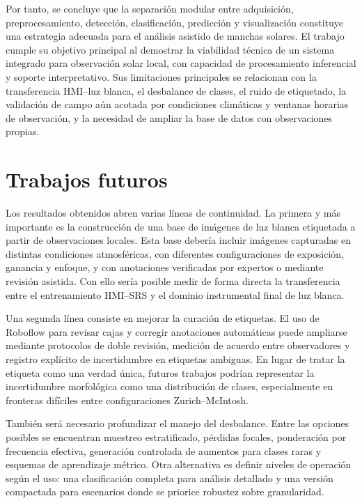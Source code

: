 Por tanto, se concluye que la separación modular entre adquisición,
preprocesamiento, detección, clasificación, predicción y visualización constituye
una estrategia adecuada para el análisis asistido de manchas solares. El trabajo
cumple su objetivo principal al demostrar la viabilidad técnica de un sistema
integrado para observación solar local, con capacidad de procesamiento
inferencial y soporte interpretativo. Sus limitaciones principales se relacionan
con la transferencia HMI--luz blanca, el desbalance de clases, el ruido de
etiquetado, la validación de campo aún acotada por condiciones climáticas y
ventanas horarias de observación, y la necesidad de ampliar la base de datos con
observaciones propias.

\section{Trabajos futuros}

Los resultados obtenidos abren varias líneas de continuidad. La primera y más
importante es la construcción de una base de imágenes de luz blanca etiquetada a
partir de observaciones locales. Esta base debería incluir imágenes capturadas en
distintas condiciones atmosféricas, con diferentes configuraciones de exposición,
ganancia y enfoque, y con anotaciones verificadas por expertos o mediante revisión
asistida. Con ello sería posible medir de forma directa la transferencia entre el
entrenamiento HMI--SRS y el dominio instrumental final de luz blanca.

Una segunda línea consiste en mejorar la curación de etiquetas. El uso de
Roboflow para revisar cajas y corregir anotaciones automáticas puede ampliarse
mediante protocolos de doble revisión, medición de acuerdo entre observadores y
registro explícito de incertidumbre en etiquetas ambiguas. En lugar de tratar la
etiqueta como una verdad única, futuros trabajos podrían representar la
incertidumbre morfológica como una distribución de clases, especialmente en
fronteras difíciles entre configuraciones Zurich--McIntosh.

También será necesario profundizar el manejo del desbalance. Entre las opciones
posibles se encuentran muestreo estratificado, pérdidas focales, ponderación por
frecuencia efectiva, generación controlada de aumentos para clases raras y
esquemas de aprendizaje métrico. Otra alternativa es definir niveles de operación
según el uso: una clasificación completa para análisis detallado y una versión
compactada para escenarios donde se priorice robustez sobre granularidad.

